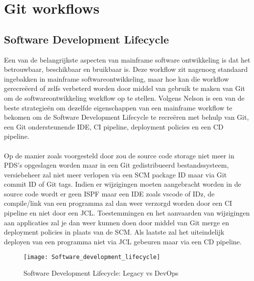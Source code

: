 \section{Git workflows}
\subsection{Software Development Lifecycle}
Een van de belangrijkste aspecten van mainframe software ontwikkeling is dat het betrouwbaar, beschikbaar en bruikbaar is. Deze workflow zit nagenoeg standaard ingebakken in mainframe softwareontwikkeling, maar hoe kan die workflow gerecreëerd of zelfs verbeterd worden door middel van gebruik te maken van Git om de softwareontwikkeling workflow op te stellen. Volgens Nelson \textcite{Lopez2023} is een van de beste strategieën om dezelfde eigenschappen van een mainframe workflow te bekomen om de Software Development Lifecycle te recreëren met behulp van Git, een Git ondersteunende IDE, CI pipeline, deployment policies en een CD pipeline.
\\ \\
Op de manier zoals voorgesteld door \textcite{Lopez2023} zou de source code storage niet meer in PDS's opgeslagen worden maar in een Git gedistribueerd bestandssysteem, versiebeheer zal niet meer verlopen via een SCM package ID maar via Git commit ID of Git tags. Indien er wijzigingen moeten aangebracht worden in de source code wordt er geen ISPF maar een IDE zoals vscode of IDz, de compile/link van een programma zal dan weer verzorgd worden door een CI pipeline en niet door een JCL. Toestemmingen en het aanvaarden van wijzigingen aan applicaties zal je dan weer kunnen doen door middel van Git merge en deployment policies in plaats van de SCM. Als laatste zal het uiteindelijk deployen van een programma niet via JCL gebeuren maar via een CD pipeline.
\begin{figure}[h]
    \centering
    \texttt{[image: Software\_development\_lifecycle]}
    \caption{Software Development Lifecycle: Legacy vs DevOps \autocite{Lopez2023}}
    \label{fig:software development lifecycle}
\end{figure}
\\ \\ \\ \\
